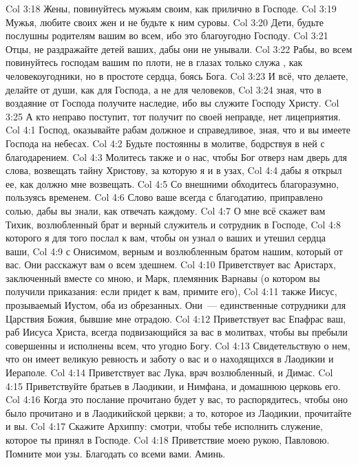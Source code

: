 \rsbpar\vs Col 3:18 Жены, повинуйтесь мужьям своим, как прилично в Господе.
\vs Col 3:19 Мужья, любите своих жен и не будьте к ним суровы.
\vs Col 3:20 Дети, будьте послушны родителям вашим во всем, ибо это благоугодно Господу.
\vs Col 3:21 Отцы, не раздражайте детей ваших, дабы они не унывали.
\vs Col 3:22 Рабы, во всем повинуйтесь господам вашим по плоти, не в глазах только служа , как человекоугодники, но в простоте сердца, боясь Бога.
\vs Col 3:23 И всё, что делаете, делайте от души, как для Господа, а не для человеков,
\vs Col 3:24 зная, что в воздаяние от Господа получите наследие, ибо вы служите Господу Христу.
\vs Col 3:25 А кто неправо поступит, тот получит по своей неправде,  нет лицеприятия.
\vs Col 4:1 Господ, оказывайте рабам должное и справедливое, зная, что и вы имеете Господа на небесах.
\rsbpar\vs Col 4:2 Будьте постоянны в молитве, бодрствуя в ней с благодарением.
\vs Col 4:3 Молитесь также и о нас, чтобы Бог отверз нам дверь для слова, возвещать тайну Христову, за которую я и в узах,
\vs Col 4:4 дабы я открыл ее, как должно мне возвещать.
\vs Col 4:5 Со внешними обходитесь благоразумно, пользуясь временем.
\vs Col 4:6 Слово ваше  всегда с благодатию, приправлено солью, дабы вы знали, как отвечать каждому.
\rsbpar\vs Col 4:7 О мне всё скажет вам Тихик, возлюбленный брат и верный служитель и сотрудник в Господе,
\vs Col 4:8 которого я для того послал к вам, чтобы он узнал о ваших  и утешил сердца ваши,
\vs Col 4:9 с Онисимом, верным и возлюбленным братом нашим, который от вас. Они расскажут вам о всем здешнем.
\rsbpar\vs Col 4:10 Приветствует вас Аристарх, заключенный вместе со мною, и Марк, племянник Варнавы (о котором вы получили приказания: если придет к вам, примите его),
\vs Col 4:11 также Иисус, прозываемый Иустом, оба из обрезанных. Они~--- единственные сотрудники для Царствия Божия, бывшие мне отрадою.
\vs Col 4:12 Приветствует вас Епафрас ваш, раб Иисуса Христа, всегда подвизающийся за вас в молитвах, чтобы вы пребыли совершенны и исполнены всем, что угодно Богу.
\vs Col 4:13 Свидетельствую о нем, что он имеет великую ревность и заботу о вас и о находящихся в Лаодикии и Иераполе.
\vs Col 4:14 Приветствует вас Лука, врач возлюбленный, и Димас.
\vs Col 4:15 Приветствуйте братьев в Лаодикии, и Нимфана, и домашнюю церковь его.
\rsbpar\vs Col 4:16 Когда это послание прочитано будет у вас, то распорядитесь, чтобы оно было прочитано и в Лаодикийской церкви; а то, которое из Лаодикии, прочитайте и вы.
\rsbpar\vs Col 4:17 Скажите Архиппу: смотри, чтобы тебе исполнить служение, которое ты принял в Господе.
\rsbpar\vs Col 4:18 Приветствие моею рукою, Павловою. Помните мои узы. Благодать со всеми вами. Аминь.
